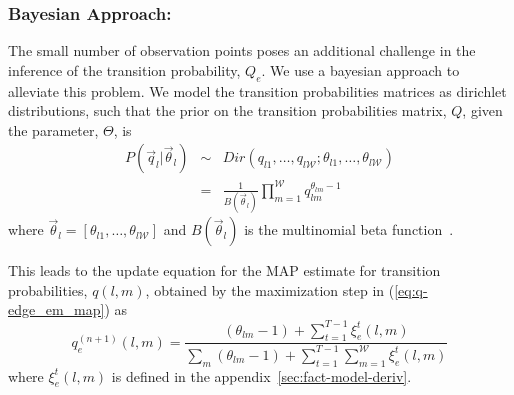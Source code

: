 \documentclass{bioinfo}
\begin{document}
\begin{methods}
\subsubsection{Bayesian Approach: } The small number of observation
points poses an additional challenge in the inference of the
transition probability, $Q_{e}$. We use a 
bayesian approach to alleviate this problem.
We model the transition probabilities matrices as dirichlet distributions,
such that  the prior on the transition probabilities matrix, $Q$, 
given the parameter, $\Theta$, is
\begin{eqnarray}
  \label{eq:q_prior}
  P(\vec{q}_{l} | \vec{\theta}_{l}) &\sim& Dir(q_{l1}, \ldots, q_{l\mathcal{W}} ;
  \theta_{l1},\ldots, \theta_{l\mathcal{W}}) \\
&=& \frac{1}{B(\vec{\theta}_{l})} \prod_{m=1}^{\mathcal{W}} q_{lm}^{\theta_{lm}-1}
\end{eqnarray}
where $\vec{\theta}_{l}=[\theta_{l1},\ldots,\theta_{l\mathcal{W}}]$ and
$B(\vec{\theta}_{l})$ is the multinomial beta
function~\citep{Gelman03bayesian}.

This leads to the update equation for the MAP estimate for transition
probabilities, $q(l,m)$, obtained by the maximization step in (\ref{eq:q-edge_em_map}) as
\begin{equation}
  \label{eq:q-update}
  q^{(n+1)}_{e}(l, m) = \frac{(\theta_{lm}-1) + \sum_{t=1}^{T-1} \xi^{t}_{e}(l,
    m) }{\sum_{m} (\theta_{lm} -1) + \sum^{T-1}_{t=1} \sum^{\mathcal
      W}_{m=1} \xi^{t}_{e}(l,m)}
\end{equation}
where $\xi^{t}_{e}(l,m)$ is defined in the appendix~\ref{sec:fact-model-deriv}.


\end{methods}
\end{document}
